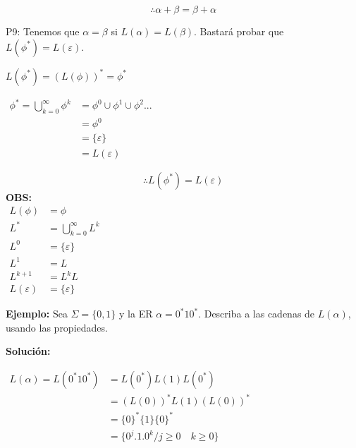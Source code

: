 $$\therefore \alpha+\beta=\beta+\alpha$$


P9: Tenemos que $\alpha=\beta$ si $L(\alpha)=L(\beta)$. Bastará probar que $L(\phi^*)=L(\varepsilon)$.

$L(\phi^*)=(L(\phi))^*=\phi^*$

$\begin{array}{rl}
\phi^* = \bigcup_{k=0}^\infty \phi^k &= \phi^0 \cup\phi^1 \cup\phi^2...\\
				&=\phi^0\\
				&=\{\varepsilon\}\\
				&=L(\varepsilon)
				\end{array}$
				
$$\therefore L(\phi^*)=L(\varepsilon)$$
\textbf{OBS: }\\
$\begin{array}{ll}
L(\phi)&=\phi\\
L^* &=\bigcup_{k=0}^\infty L^k \\
L^0 &=\{\varepsilon\}\\
L^1 &=L\\
L^{k+1} &=L^{k}L\\
L(\varepsilon) &=\{\varepsilon\}
\end{array}$

\textbf{Ejemplo: }Sea $\Sigma=\{0,1\}$ y la ER $\alpha=0^*10^*$. Describa a las cadenas de $L(\alpha)$, usando las propiedades.

\textbf{Solución:}

$\begin{array}{rl}
L(\alpha)=L(0^*10^*) &=L(0^*)L(1)L(0^*)\\
		&=(L(0))^* L(1)(L(0))^* \\
		&=\{0\}^*\{1\}\{0\}^*\\
		&=\{0^j.1.0^k / j\geq 0 \quad k\geq 0 \}
\end{array}$